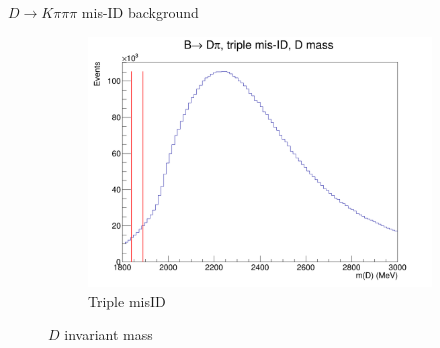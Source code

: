 \documentclass{beamer}
\begin{document}
\begin{frame}{$D\to K\pi\pi\pi$ mis-ID background}
\begin{figure}
\begin{subfigure}{0.45\textwidth}
      \includegraphics[width = 1.0\textwidth]{Plots/Kpipipi_TripleMisID_Dpi_DMass.png}
      \caption{Triple misID}
    \end{subfigure}
    \caption{$D$ invariant mass}
  \end{figure}
\end{frame}
\end{document}
